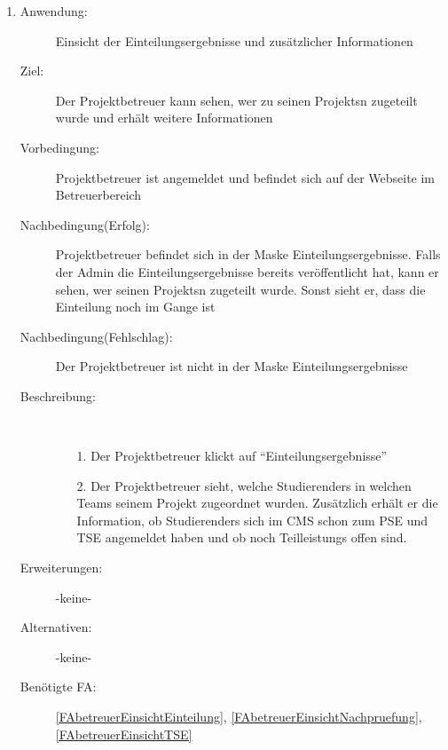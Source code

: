 \documentclass[parskip=full]{scrartcl}
\newcommand{\swtLabel}[1]{\textbf{/#1\arabic*0/}}
\begin{document}
\begin{enumerate} [label=\swtLabel{B}]
  
  \item \label{UCbetreuerEinsichtEinteilungProjekt}
  \begin{description}
  	\item[Anwendung:] Einsicht der \gls{Einteilung}sergebnisse und zusätzlicher Informationen
  	\item[Ziel:] Der \gls{Projektbetreuer} kann sehen, wer zu seinen \glspl{Projekt}n zugeteilt wurde und erhält weitere Informationen
  	\item[Vorbedingung:] \gls{Projektbetreuer} ist angemeldet und befindet sich auf der
  	Webseite im Betreuerbereich  %
  	\item[Nachbedingung(Erfolg):] \gls{Projektbetreuer} befindet sich in der Maske
  	\gls{Einteilung}sergebnisse. %
  	Falls der \gls{Admin} die \gls{Einteilung}sergebnisse bereits veröffentlicht hat, kann er
  	sehen, wer seinen \glspl{Projekt}n zugeteilt wurde. Sonst sieht er, dass die \gls{Einteilung}
  	noch im Gange ist
  	\item[Nachbedingung(Fehlschlag):] Der \gls{Projektbetreuer} ist nicht in der
  	Maske \gls{Einteilung}sergebnisse
  	\item[Beschreibung:]~
  	\begin{enumerate}
  		\item[1.] Der \gls{Projektbetreuer} klickt auf \enquote{\gls{Einteilung}sergebnisse} 
		\item[2.] Der \gls{Projektbetreuer} sieht, welche \glspl{Studierender} in welchen \glspl{Team} seinem \gls{Projekt} zugeordnet wurden. Zusätzlich erhält er die Information, ob \glspl{Studierender} sich im CMS schon zum \gls{PSE} und \gls{TSE} angemeldet haben und ob noch \glspl{Teilleistung} offen sind.
  	\end{enumerate}
  	\item[Erweiterungen:] -keine-
  	
  	\item[Alternativen:] -keine-
  	
  	\item[Benötigte FA:] \ref{FAbetreuerEinsichtEinteilung}, \ref{FAbetreuerEinsichtNachpruefung}, \ref{FAbetreuerEinsichtTSE}
  \end{description}
   

\end{enumerate}
\end{document}
